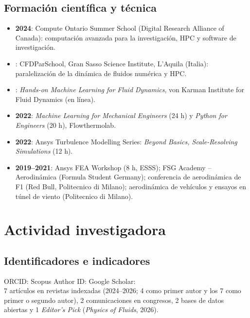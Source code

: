 \documentclass[11pt]{article}
\begin{document}
\subsection{Formaci\'on cient\'ifica y t\'ecnica}
\begin{itemize}
  \item \textbf{2024}: Compute Ontario Summer School (Digital Research Alliance of
  Canada): computaci\'on avanzada para la investigaci\'on, HPC y software de investigaci\'on.
  \item \textbf{}: CFDParSchool, Gran Sasso Science Institute, L'Aquila (Italia):
  paralelizaci\'on de la din\'amica de fluidos num\'erica y HPC.
  \item \textbf{}: \emph{Hands-on Machine Learning for Fluid Dynamics}, von
  Karman Institute for Fluid Dynamics (en l\'inea).
  \item \textbf{2022}: \emph{Machine Learning for Mechanical Engineers} (24 h)
   y \emph{Python for Engineers} (20 h), Flowthermolab.
  \item \textbf{2022}: Ansys Turbulence Modelling Series: \emph{Beyond Basics,
  Scale-Resolving Simulations} (12 h).
  \item \textbf{2019--2021}: Ansys FEA Workshop (8 h, ESSS); FSG Academy -- Aerodin\'amica
  (Formula Student Germany); conferencia de aerodin\'amica de F1 (Red Bull, Politecnico di
  Milano); aerodin\'amica de veh\'iculos y ensayos en t\'unel de viento (Politecnico di Milano).
\end{itemize}

\section{Actividad investigadora}

\subsection{Identificadores e indicadores}
ORCID: \TODO{} \quad Scopus Author ID: \TODO{} \quad Google Scholar: \TODO{}\\
7 art\'iculos en revistas indexadas (2024--2026; 4 como primer autor y los 7 como primer o
segundo autor), 2 comunicaciones en congresos, 2 bases de datos abiertas y 1
\emph{Editor's Pick} (\emph{Physics of Fluids}, 2026).
\end{document}
